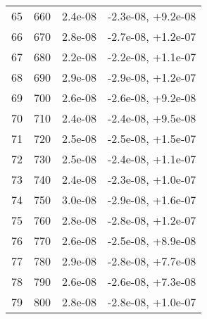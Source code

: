 \begin{table}
\begin{adjustbox}{width=1\textwidth/2}
\begin{tabular}{|c|c|c|c|}
\cline{1-4}
65 & 660 & 2.4e-08 & -2.3e-08, +9.2e-08 \\
\cline{1-4}
66 & 670 & 2.8e-08 & -2.7e-08, +1.2e-07 \\
\cline{1-4}
67 & 680 & 2.2e-08 & -2.2e-08, +1.1e-07 \\
\cline{1-4}
68 & 690 & 2.9e-08 & -2.9e-08, +1.2e-07 \\
\cline{1-4}
69 & 700 & 2.6e-08 & -2.6e-08, +9.2e-08 \\
\cline{1-4}
70 & 710 & 2.4e-08 & -2.4e-08, +9.5e-08 \\
\cline{1-4}
71 & 720 & 2.5e-08 & -2.5e-08, +1.5e-07 \\
\cline{1-4}
72 & 730 & 2.5e-08 & -2.4e-08, +1.1e-07 \\
\cline{1-4}
73 & 740 & 2.4e-08 & -2.3e-08, +1.0e-07 \\
\cline{1-4}
74 & 750 & 3.0e-08 & -2.9e-08, +1.6e-07 \\
\cline{1-4}
75 & 760 & 2.8e-08 & -2.8e-08, +1.2e-07 \\
\cline{1-4}
76 & 770 & 2.6e-08 & -2.5e-08, +8.9e-08 \\
\cline{1-4}
77 & 780 & 2.9e-08 & -2.8e-08, +7.7e-08 \\
\cline{1-4}
78 & 790 & 2.6e-08 & -2.6e-08, +7.3e-08 \\
\cline{1-4}
79 & 800 & 2.8e-08 & -2.8e-08, +1.0e-07 \\
\cline{1-4}
\end{tabular}
\end{adjustbox}
\end{table}

